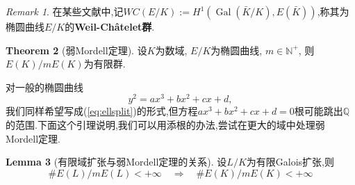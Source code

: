 \documentclass[12pt,A4paper,oneside,reqno]{amsart}
\numberwithin{equation}{section}
\theoremstyle{definition}
\newtheorem{theorem}{Theorem}[section]
\newtheorem{lemma}[theorem]{Lemma}
\theoremstyle{plain}
\theoremstyle{plain}
\numberwithin{equation}{section}
\theoremstyle{remark}
\newtheorem{remark}[theorem]{Remark}
\newcommand{\Gal}{\operatorname{Gal}}
\begin{document}
\begin{remark}
	在某些文献中,记$WC(E/K):= H^1(\Gal (\bar{K}/K),E(\bar{K}))$,称其为椭圆曲线$E/K$的\textbf{Weil-Ch\^{a}telet群}.
\end{remark}
\begin{theorem}[弱Mordell定理]
	设$K$为数域, $E/K$为椭圆曲线, $m \in \mathbb{N}^+$, 则$E(K)/mE(K)$为有限群.
\end{theorem}
对一般的椭圆曲线
$$y^2=ax^3+bx^2+cx+d, $$
我们同样希望写成(\ref{eq:ellsplit})的形式,但方程$ax^3+bx^2+cx+d=0$根可能跳出$\mathbb{Q}$的范围.下面这个引理说明,我们可以用添根的办法,尝试在更大的域中处理弱Mordell定理.
\begin{lemma}[有限域扩张与弱Mordell定理的关系]
	设$L/K$为有限Galois扩张,则
	$$\#E(L)/mE(L) < + \infty \quad \Longrightarrow \quad \#E(K)/mE(K) < + \infty$$
\end{lemma}
\end{document}
